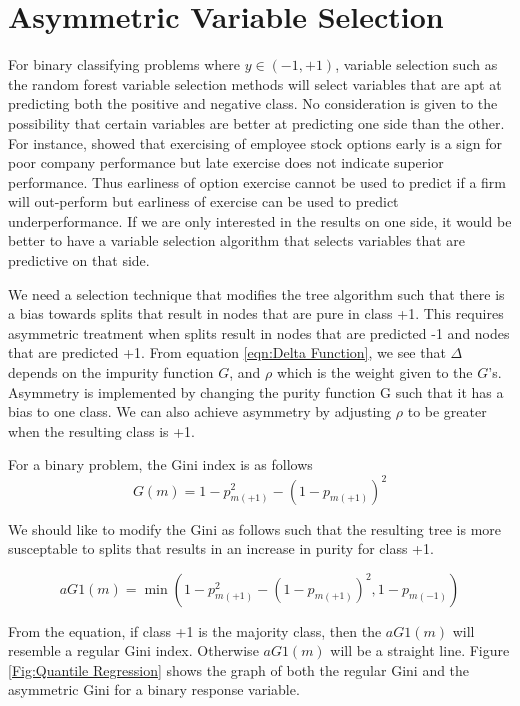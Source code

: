 \section{Asymmetric Variable Selection}
For binary classifying problems where $y\in (-1,+1)$, variable selection such as the random forest variable selection methods will select variables that are apt at predicting both the positive and negative class. No consideration is given to the possibility that certain variables are better at predicting one side than the other. For instance, \cite{Bettis05} showed that exercising of employee stock options early is a sign for poor company performance but late exercise does not indicate superior performance. Thus earliness of option exercise cannot be used to predict if a firm will out-perform but earliness of exercise can be used to predict underperformance. If we are only interested in the results on one side, it would be better to have a variable selection algorithm that selects variables that are predictive on that side. 

We need a selection technique that modifies the tree algorithm such that there is a bias towards splits that result in nodes that are pure in class +1. This requires asymmetric treatment when splits result in nodes that are predicted -1 and nodes that are predicted +1. From equation \ref{eqn:Delta Function}, we see that $\Delta$ depends on the impurity function $G$, and $\rho$ which is the weight given to the $G$'s. Asymmetry is implemented by changing the purity function G such that it has a bias to one class. We can also achieve asymmetry by adjusting $\rho$ to be greater when the resulting class is +1. 

For a binary problem, the Gini index is as follows
\begin{equation}\label{eqn:giniindex}
	G(m)=1-p_{m(+1)}^2-(1-p_{m(+1)})^2
\end{equation}

We should like to modify the Gini as follows such that the resulting tree is more susceptable to splits that results in an increase in purity for class +1. 

\begin{equation}\label{eqn:asymmetricginiindex1}
	aG1(m)=\min(1-p_{m(+1)}^2-(1-p_{m(+1)})^2, 1-p_{m(-1)})
\end{equation}

From the equation, if class +1 is the majority class, then the $aG1(m)$ will resemble a regular Gini index. Otherwise  $aG1(m)$ will be a straight line. Figure \ref{Fig:Quantile Regression} shows the graph of both the regular Gini and the asymmetric Gini for a binary response variable.

